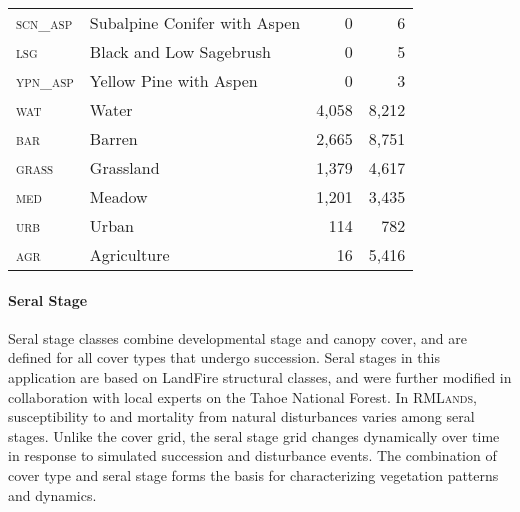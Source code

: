 \begin{table}[!htbp]
\begin{tabular}{@{}llrr@{}}
                        \textsc{scn\_asp}     & Subalpine Conifer with Aspen                 & 0           & 6          \\
\rowcolor[HTML]{CAD6BA} \textsc{lsg     }     & Black and Low Sagebrush                      & 0           & 5          \\
                        \textsc{ypn\_asp}     & Yellow Pine with Aspen                       & 0           & 3          \\ 
\midrule
                        \textsc{wat     }     & Water                                        & 4,058       & 8,212      \\
\rowcolor[HTML]{CAD6BA} \textsc{bar     }     & Barren                                       & 2,665       & 8,751      \\
                        \textsc{grass   }     & Grassland                                    & 1,379       & 4,617      \\
\rowcolor[HTML]{CAD6BA} \textsc{med     }     & Meadow                                       & 1,201       & 3,435      \\
                        \textsc{urb     }     & Urban                                        & 114         & 782        \\
\rowcolor[HTML]{CAD6BA} \textsc{agr     }     & Agriculture                                  & 16          & 5,416      \\
\bottomrule

\end{tabular}
\end{table}

\paragraph*{Seral Stage}
Seral stage classes combine developmental stage and canopy cover, and are defined for all cover types that undergo succession. Seral stages in this application are based on LandFire structural classes, and were further modified in collaboration with local experts on the Tahoe National Forest. In \textsc{RMLands}, susceptibility to and mortality from natural disturbances varies among seral stages. Unlike the cover grid, the seral stage grid changes dynamically over time in response to simulated succession and disturbance events. The combination of cover type and seral stage forms the basis for characterizing vegetation patterns and dynamics.

